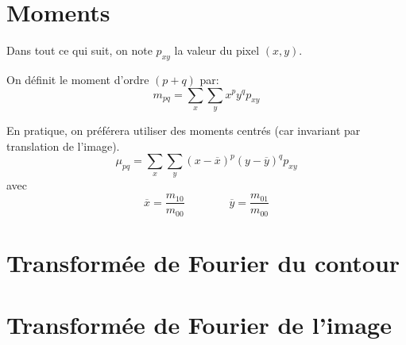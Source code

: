 \section{Moments}



Dans tout ce qui suit, on note $p_{xy}$ la valeur du pixel $(x,y)$.

On définit le moment d'ordre $(p+q)$ par:
\[
m_{pq} = \sum_x \sum_y x^p y^q p_{xy}
\]

En pratique, on préférera utiliser des moments centrés (car invariant 
par translation de l'image).
\[
\mu_{pq} = \sum_x \sum_y (x - \overline{x})^p (y - \overline{y})^q p_{xy}
\]
avec 
\[
\overline{x} = \frac{m_{10}}{m_{00}} \qquad \qquad \overline{y} = \frac{m_{01}}{m_{00}}
\]



\section{Transformée de Fourier du contour}



\section{Transformée de Fourier de l'image}